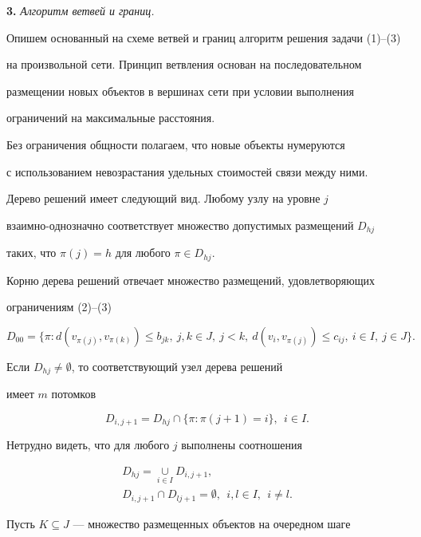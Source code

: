 {\bf 3.} {\it Алгоритм ветвей и границ.}


Опишем основанный на схеме ветвей и границ алгоритм решения задачи (1)--(3)


на произвольной сети. Принцип ветвления основан на последовательном


размещении новых объектов в вершинах сети при условии выполнения


ограничений на максимальные расстояния.


Без ограничения общности полагаем, что новые объекты нумеруются


с использованием невозрастания удельных стоимостей связи между ними.


Дерево решений имеет следующий вид. Любому узлу на уровне $j$


взаимно-однозначно соответствует множество допустимых размещений $D_{hj}$


таких, что $\pi(j)=h$ для любого $\pi \in D_{hj}$.


Корню дерева решений отвечает множество размещений, удовлетворяющих


ограничениям (2)--(3)


$$


D_{00} = \{\pi:d(v_{\pi(j)},v_{\pi(k)}) \leq b_{jk}, \ j,k \in J, \ j < k, 


\ d(v_{i},v_{\pi(j)}) \leq c_{ij}, \ i \in I, \ j \in J\}. 


$$


Если $D_{hj} \neq \emptyset$, то соответствующий узел дерева решений


имеет $m$ потомков


$$


D_{i,j+1} = D_{hj} \cap \{\pi:\pi(j+1)=i\}, \ \ i \in I.


$$


Нетрудно видеть, что для любого $j$ выполнены соотношения


\begin{gather*}


D_{hj} = \mathop{\cup}\limits_{i \in I} D_{i,j+1},\\


D_{i,j+1} \cap D_{lj+1} = \emptyset, \ \ i,l \in I, \ \ i \neq l.


\end{gather*}





Пусть $K \subseteq J$ --- множество размещенных объектов на очередном шаге


